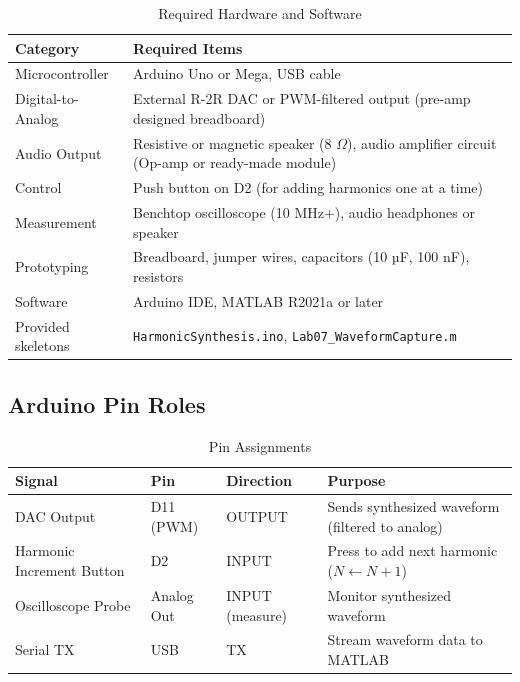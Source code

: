 \documentclass[11pt,letterpaper]{article}
\begin{document}
\begin{table}[H]
    \centering
    \caption{Required Hardware and Software}
    \label{tab:equipment}
    \begin{tabularx}{\linewidth}{l X}
    \toprule
    \textbf{Category} & \textbf{Required Items}\\
    \midrule
    Microcontroller & Arduino Uno or Mega, USB cable\\
    Digital-to-Analog & External R-2R DAC or PWM-filtered output (pre-amp designed breadboard)\\
    Audio Output & Resistive or magnetic speaker (8 $\Omega$), audio amplifier circuit (Op-amp or ready-made module)\\
    Control & Push button on D2 (for adding harmonics one at a time)\\
    Measurement & Benchtop oscilloscope (10 MHz+), audio headphones or speaker\\
    Prototyping & Breadboard, jumper wires, capacitors (10 µF, 100 nF), resistors\\
    Software & Arduino IDE, MATLAB R2021a or later\\
    Provided skeletons & \texttt{HarmonicSynthesis.ino}, \texttt{Lab07\_WaveformCapture.m}\\
    \bottomrule
    \end{tabularx}
\end{table}

\subsection*{Arduino Pin Roles}

\begin{table}[H]
    \centering
    \caption{Pin Assignments}
    \label{tab:pins}
    \begin{tabularx}{\linewidth}{l l l X}
    \toprule
    \textbf{Signal} & \textbf{Pin} & \textbf{Direction} & \textbf{Purpose}\\
    \midrule
    DAC Output & D11 (PWM) & OUTPUT & Sends synthesized waveform (filtered to analog)\\
    Harmonic Increment Button & D2 & INPUT & Press to add next harmonic ($N \leftarrow N+1$)\\
    Oscilloscope Probe & Analog Out & INPUT (measure) & Monitor synthesized waveform\\
    Serial TX & USB & TX & Stream waveform data to MATLAB\\
    \bottomrule
    \end{tabularx}
\end{table}
\end{document}
